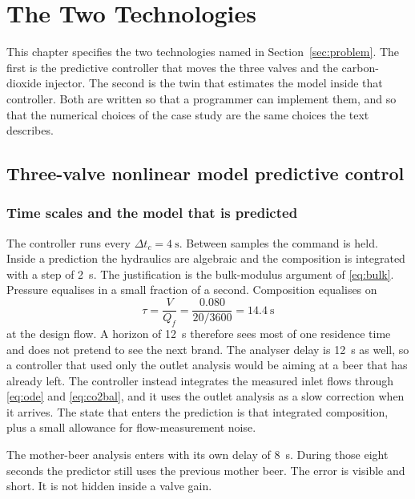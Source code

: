 \chapter{The Two Technologies}
\label{ch:methods}

This chapter specifies the two technologies named in Section~\ref{sec:problem}. The first is the predictive controller that moves the three valves and the carbon-dioxide injector. The second is the twin that estimates the model inside that controller. Both are written so that a programmer can implement them, and so that the numerical choices of the case study are the same choices the text describes.

\section{Three-valve nonlinear model predictive control}
\label{sec:nmpc}

\subsection{Time scales and the model that is predicted}

The controller runs every $\Delta t_c = \SI{4}{\second}$. Between samples the command is held. Inside a prediction the hydraulics are algebraic and the composition is integrated with a step of \SI{2}{\second}. The justification is the bulk-modulus argument of \eqref{eq:bulk}. Pressure equalises in a small fraction of a second. Composition equalises on
\begin{equation}
\label{eq:tau}
\tau = \frac{V}{Q_f}
=
\frac{0.080}{20/3600}
=
\SI{14.4}{\second}
\end{equation}
at the design flow. A horizon of \SI{12}{\second} therefore sees most of one residence time and does not pretend to see the next brand. The analyser delay is \SI{12}{\second} as well, so a controller that used only the outlet analysis would be aiming at a beer that has already left. The controller instead integrates the measured inlet flows through \eqref{eq:ode} and \eqref{eq:co2bal}, and it uses the outlet analysis as a slow correction when it arrives. The state that enters the prediction is that integrated composition, plus a small allowance for flow-measurement noise.

The mother-beer analysis enters with its own delay of \SI{8}{\second}. During those eight seconds the predictor still uses the previous mother beer. The error is visible and short. It is not hidden inside a valve gain.

